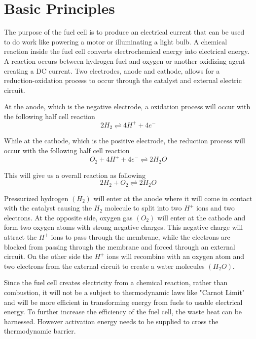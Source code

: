 \section{Basic Principles}
The purpose of the fuel cell is to produce an electrical current that can be used to do work like powering a motor or illuminating a light bulb. A chemical reaction inside the fuel cell converts electrochemical energy into electrical energy. A reaction occurs between hydrogen fuel and oxygen or another oxidizing agent creating a DC current. Two electrodes, anode and cathode, allows for a reduction-oxidation process to occur through the catalyst and external electric circuit. 

At the anode, which is the negative electrode, a oxidation process will occur with the following half cell reaction
\begin{equation}
    2H_2 \rightleftharpoons 4H^++ 4e^-
\end{equation}

While at the cathode, which is the positive electrode, the reduction process will occur with the following half cell reaction
\begin{equation}
    O_2 +4H^+ + 4e^- \rightleftharpoons 2H_2O
\end{equation}

This will give us a overall reaction as following
\begin{equation}
    2H_2 + O_2 \rightleftharpoons 2H_2O
\end{equation}


Pressurized hydrogen $(H_2)$ will enter at the anode where it will come in contact with the catalyst causing the $H_2$ molecule to split into two $H^+$ ions and two electrons. At the opposite side, oxygen gas $(O_2)$ will enter at the cathode and form two oxygen atoms with strong negative charges. This negative charge will attract the $H^+$ ions to pass through the membrane, while the electrons are blocked from passing through the membrane and forced through an external circuit. On the other side the $H^+$ ions will recombine with an oxygen atom and two electrons from the external circuit to create a water molecules $(H_2O)$.


Since the fuel cell creates electricity from a chemical reaction, rather than combustion, it will not be a subject to thermodynamic laws like "Carnot Limit" and will be more efficient in transforming energy from fuels to usable electrical energy. To further increase the efficiency of the fuel cell, the waste heat can be harnessed. However activation energy needs to be supplied to cross the thermodynamic barrier.

